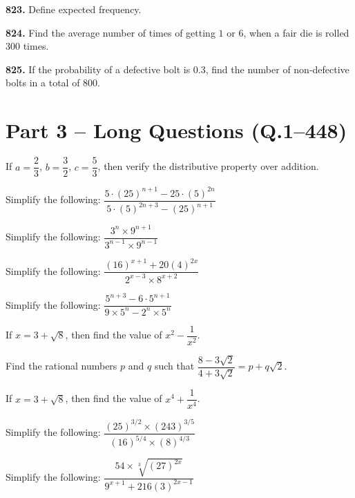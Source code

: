 \documentclass[11pt]{article}
\begin{document}
\bigskip
\noindent\textbf{823.} Define expected frequency.

\bigskip
\noindent\textbf{824.} Find the average number of times of getting $1$ or $6$, when a fair die is rolled $300$ times.

\bigskip
\noindent\textbf{825.} If the probability of a defective bolt is $0.3$, find the number of non-defective bolts in a total of $800$.



\clearpage

\section*{Part 3 -- Long Questions (Q.1--448)}

\begin{detq}

\item If $a=\dfrac{2}{3}$, $b=\dfrac{3}{2}$, $c=\dfrac{5}{3}$, then verify the distributive property over addition.

\item Simplify the following: $\dfrac{5\cdot(25)^{n+1}-25\cdot(5)^{2n}}{5\cdot(5)^{2n+3}-(25)^{n+1}}$

\item Simplify the following: $\dfrac{3^n \times 9^{n+1}}{3^{n-1}\times 9^{n-1}}$

\item Simplify the following: $\dfrac{(16)^{x+1}+20(4)^{2x}}{2^{x-3}\times 8^{x+2}}$

\item Simplify the following: $\dfrac{5^{n+3}-6\cdot5^{n+1}}{9\times5^n - 2^n\times5^n}$

\item If $x=3+\sqrt{8}$, then find the value of $x^2-\dfrac{1}{x^2}$.

\item Find the rational numbers $p$ and $q$ such that $\dfrac{8-3\sqrt{2}}{4+3\sqrt{2}} = p+q\sqrt{2}$.

\item If $x=3+\sqrt{8}$, then find the value of $x^4+\dfrac{1}{x^4}$.

\item Simplify the following: $\dfrac{(25)^{3/2}\times(243)^{3/5}}{(16)^{5/4}\times(8)^{4/3}}$

\item Simplify the following: $\dfrac{54\times\sqrt[3]{(27)^{2x}}}{9^{x+1}+216(3)^{2x-1}}$


\end{detq}
\end{document}
